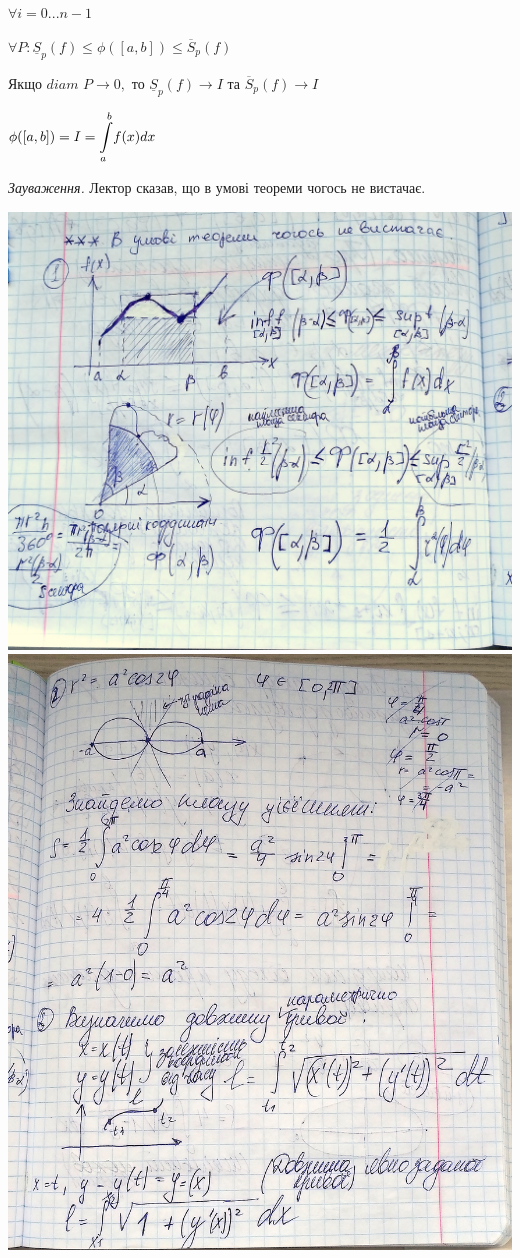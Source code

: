 \documentclass[12pt]{report}
\begin{document}
$ \forall i = 0 ... n-1 $

$ \forall P: \underline S_p(f) \leq \phi ([a,b]) \leq \overline S_p(f)$
 
Якщо $ diam $ $P \rightarrow 0, $ то $ \underline S_p(f) \rightarrow I  $ та $  \overline S_p(f) \rightarrow I   $

$  \phi ([a,b]) = I = \mathlarger\int\limits_a^b f(x)dx$

\vspace{3mm}
\textit{Зауваження.} Лектор сказав, що в умові теореми чогось не вистачає.

\includegraphics[scale = 0.2]{image1.jpg}
\includegraphics[scale = 0.2]{image2.jpg}
\end{document}
